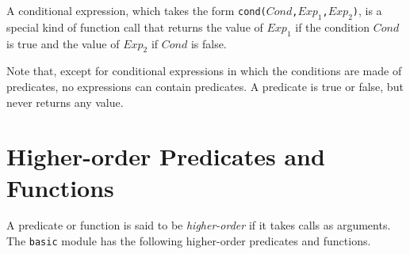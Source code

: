 A conditional expression, which takes the form \texttt{cond($Cond$,$Exp_1$,$Exp_2$)}, is a special kind of function call that returns the value of $Exp_1$ if the condition $Cond$ is true and the value of $Exp_2$ if $Cond$ is false.

Note that, except for conditional expressions in which the conditions are made of predicates, no expressions can contain predicates. A predicate is true or false, but never returns any value.


\section{Higher-order Predicates and Functions}
A predicate or function is said to be \emph{higher-order} if it takes calls as arguments. The \texttt{basic} module has the following higher-order predicates and functions.

